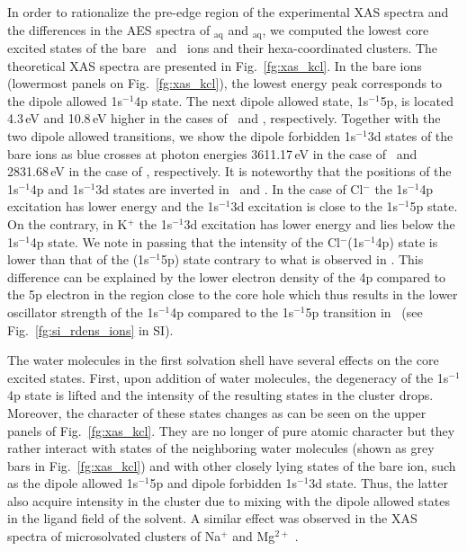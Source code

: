 In order to rationalize the pre-edge region of the experimental XAS spectra and the differences in the AES spectra of \ki$_{\text{aq}}$ and \cli$_{\text{aq}}$, we computed the lowest core excited states of the bare \ki~and \cli~ions and their hexa-coordinated clusters. The theoretical XAS spectra are presented in Fig.\ \ref{fg:xas_kcl}. In the bare ions (lowermost panels on Fig.\ \ref{fg:xas_kcl}), the lowest energy peak corresponds to the dipole allowed 1s$^{-1}$4p state. The next dipole allowed state, 1s$^{-1}$5p, is located 4.3\,eV and 10.8\,eV higher in the cases of \ki~and \cli, respectively. Together with the two dipole allowed transitions, we show the dipole forbidden 1s$^{-1}$3d states of the bare ions as blue crosses at photon energies 3611.17\,eV in the case of \ki~and 2831.68\,eV in the case of \cli, respectively. It is noteworthy that the positions of the 1s$^{-1}$4p and 1s$^{-1}$3d states are inverted in \ki~and \cli. In the case of Cl$^{-}$ the 1s$^{-1}$4p excitation has lower energy and the 1s$^{-1}$3d excitation is close to the 1s$^{-1}$5p state. On the contrary, in K$^{+}$ the 1s$^{-1}$3d excitation has lower energy and lies below the 1s$^{-1}$4p state. We note in passing that the intensity of the Cl$^{-}$(1s$^{-1}$4p) state is lower than that of the \cli(1s$^{-1}$5p) state contrary to what is observed in \ki. This difference can be explained by the lower electron density of the 4p compared to the 5p electron in the region close to the core hole which thus results in the lower oscillator strength of the 1s$^{-1}$4p compared to the 1s$^{-1}$5p transition in \cli~(see Fig.\ \ref{fg:si_rdens_ions} in SI).


The water molecules in the first solvation shell have several effects on the core excited states. First, upon addition of water molecules, the degeneracy of the 1s$^{-1}$4p state is lifted and the intensity of the resulting states in the cluster drops. Moreover, the character of these states changes as can be seen on the upper panels of Fig.\ \ref{fg:xas_kcl}. They are no longer of pure atomic character but they rather interact with states of the neighboring water molecules (shown as grey bars in Fig.\ \ref{fg:xas_kcl}) and with other closely lying states of the bare ion, such as the dipole allowed 1s$^{-1}$5p and dipole forbidden 1s$^{-1}$3d state. Thus, the latter also acquire intensity in the cluster due to mixing with the dipole allowed states in the ligand field of the solvent. A similar effect was observed in the XAS spectra of microsolvated clusters of Na$^{+}$ and Mg$^{2+}$ \citep{miteva16:16671}.


